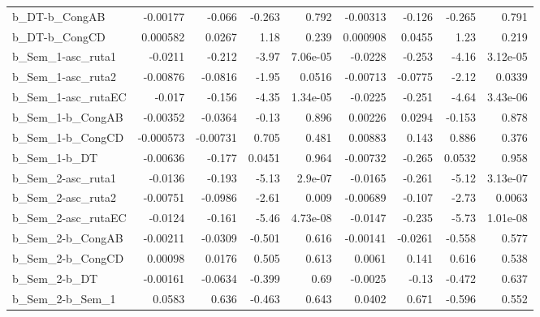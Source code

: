 \begin{tabular}{lrrrrrrrr}
b\_DT-b\_CongAB        &    -0.00177 &       -0.066 &  -0.263 &    0.792 &   -0.00313 &      -0.126 &       -0.265 &         0.791 \\
b\_DT-b\_CongCD        &    0.000582 &       0.0267 &    1.18 &    0.239 &   0.000908 &      0.0455 &         1.23 &         0.219 \\
b\_Sem\_1-asc\_ruta1    &     -0.0211 &       -0.212 &   -3.97 & 7.06e-05 &    -0.0228 &      -0.253 &        -4.16 &      3.12e-05 \\
b\_Sem\_1-asc\_ruta2    &    -0.00876 &      -0.0816 &   -1.95 &   0.0516 &   -0.00713 &     -0.0775 &        -2.12 &        0.0339 \\
b\_Sem\_1-asc\_rutaEC   &      -0.017 &       -0.156 &   -4.35 & 1.34e-05 &    -0.0225 &      -0.251 &        -4.64 &      3.43e-06 \\
b\_Sem\_1-b\_CongAB     &    -0.00352 &      -0.0364 &   -0.13 &    0.896 &    0.00226 &      0.0294 &       -0.153 &         0.878 \\
b\_Sem\_1-b\_CongCD     &   -0.000573 &     -0.00731 &   0.705 &    0.481 &    0.00883 &       0.143 &        0.886 &         0.376 \\
b\_Sem\_1-b\_DT         &    -0.00636 &       -0.177 &  0.0451 &    0.964 &   -0.00732 &      -0.265 &       0.0532 &         0.958 \\
b\_Sem\_2-asc\_ruta1    &     -0.0136 &       -0.193 &   -5.13 &  2.9e-07 &    -0.0165 &      -0.261 &        -5.12 &      3.13e-07 \\
b\_Sem\_2-asc\_ruta2    &    -0.00751 &      -0.0986 &   -2.61 &    0.009 &   -0.00689 &      -0.107 &        -2.73 &        0.0063 \\
b\_Sem\_2-asc\_rutaEC   &     -0.0124 &       -0.161 &   -5.46 & 4.73e-08 &    -0.0147 &      -0.235 &        -5.73 &      1.01e-08 \\
b\_Sem\_2-b\_CongAB     &    -0.00211 &      -0.0309 &  -0.501 &    0.616 &   -0.00141 &     -0.0261 &       -0.558 &         0.577 \\
b\_Sem\_2-b\_CongCD     &     0.00098 &       0.0176 &   0.505 &    0.613 &     0.0061 &       0.141 &        0.616 &         0.538 \\
b\_Sem\_2-b\_DT         &    -0.00161 &      -0.0634 &  -0.399 &     0.69 &    -0.0025 &       -0.13 &       -0.472 &         0.637 \\
b\_Sem\_2-b\_Sem\_1      &      0.0583 &        0.636 &  -0.463 &    0.643 &     0.0402 &       0.671 &       -0.596 &         0.552 \\

\end{tabular}
